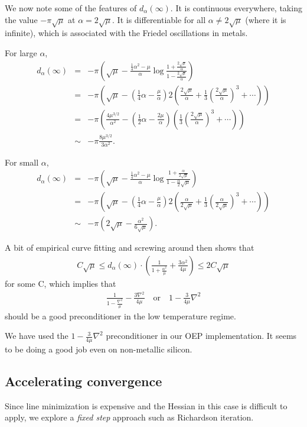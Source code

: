 \documentclass{article}
\newcommand{\beas}{\begin{eqnarray*}}
\newcommand{\enas}{\end{eqnarray*}}
\begin{document}
We now note some of the features of $d_\alpha(\infty)$.  It is continuous
everywhere, taking the value $-\pi\sqrt{\mu}$ at $\alpha = 2\sqrt{\mu}$.
It is differentiable for all $\alpha \ne 2\sqrt{\mu}$
(where it is infinite),
which is associated with the Friedel oscillations in metals.

For large $\alpha$,
\beas
d_\alpha(\infty)
 &=&
-\pi
\left(\sqrt{\mu} - \frac{\frac{1}{4} \alpha^2-\mu}{\alpha}
\log\frac{1+\frac{2\sqrt{\mu}}{\alpha}}{1-\frac{2\sqrt{\mu}}{\alpha}}\right)
\\
 &=&
-\pi
\left(\sqrt{\mu} - \left(\frac{1}{4} \alpha-\frac{\mu}{\alpha}\right)
2 \left(\frac{2\sqrt{\mu}}{\alpha} + \frac{1}{3}\left(\frac{2\sqrt{\mu}}{\alpha}\right)^3 + \cdots\right)\right)
\\
&=&
-\pi
\left(\frac{4 \mu^{3/2}}{\alpha^2}
-\left(\frac{1}{2} \alpha-\frac{2\mu}{\alpha}\right)
\left(\frac{1}{3}\left(\frac{2\sqrt{\mu}}{\alpha}\right)^3 + \cdots\right)
\right)
\\
&\sim&
-\pi
\frac{8 \mu^{3/2}}{3 \alpha^2}.
\enas

For small $\alpha$,
\beas
d_\alpha(\infty)
 &=&
-\pi
\left(\sqrt{\mu} - \frac{\frac{1}{4} \alpha^2-\mu}{\alpha}
\log\frac{1+\frac{\alpha}{2\sqrt{\mu}}}{1-\frac{\alpha}2\sqrt{\mu}}\right)
\\
&=&
-\pi
\left(\sqrt{\mu} - \left(\frac{1}{4} \alpha-\frac{\mu}{\alpha}\right)
2 \left(\frac{\alpha}{2\sqrt{\mu}} + \frac{1}{3}\left(\frac{\alpha}{2\sqrt{\mu}}\right)^3 + \cdots\right)\right)
\\
&\sim&
-\pi
\left(2\sqrt{\mu}
-\frac{\alpha^2}{6\sqrt{\mu}}
\right).
\enas

A bit of empirical curve fitting and screwing around then shows that
\beas
C \sqrt{\mu} \le
d_{\alpha}(\infty) \cdot
\left(
\frac{1}{1+\frac{\alpha^2}{\mu}}
+\frac{3\alpha^2}{4 \mu}\right) \le 2 C \sqrt{\mu}
\enas
for some C, which implies that
\beas
\frac{1}{1-\frac{\nabla^2}{\mu}}
-\frac{3\nabla^2}{4 \mu}
\quad\mbox{or}\quad
1 - \frac{3}{4\mu} \nabla^2
\enas
should be a good preconditioner in the low temperature regime.

We have used the $1 - \frac{3}{4 \mu} \nabla^2$ preconditioner in our
OEP implementation.  It seems to be doing a good job even on non-metallic
silicon.


\subsection{Accelerating convergence}

Since line minimization is expensive and the Hessian in this
case is difficult to apply, we explore a {\em fixed step}
approach such as Richardson iteration.
\end{document}
